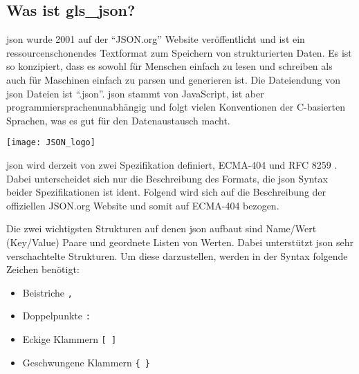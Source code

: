 \subsection{Was ist \gls{gls_json}?}\label{json_kapitel}
\begin{minipage}{0.6\textwidth}
	\acf{json} wurde 2001 auf der \enquote{JSON.org} Website veröffentlicht und ist ein ressourcenschonendes Textformat zum Speichern von strukturierten Daten. Es ist so konzipiert, dass es sowohl für Menschen einfach zu lesen und schreiben als auch für Maschinen einfach zu parsen und generieren ist. Die Dateiendung von \acs{json} Dateien ist \enquote{.json}. \acs{json} stammt von JavaScript, ist aber programmiersprachenunabhängig und folgt vielen Konventionen der C-basierten Sprachen, was es gut für den Datenaustausch macht. \cite[vgl.][]{json_org:o.J., ECMA:2017}
\end{minipage}%
\hfill
\begin{minipage}{0.37\textwidth}
	\centering	
	\texttt{[image: JSON\_logo]}
\end{minipage}
\vspace{1ex}

\acs{json} wird derzeit von zwei Spezifikation definiert, ECMA-404 \cite[vgl.][]{ECMA:2017} und RFC 8259 \cite[vgl.][]{Bray:2017}. Dabei unterscheidet sich nur die Beschreibung des Formats, die \acs{json} Syntax beider Spezifikationen ist ident. Folgend wird sich auf die Beschreibung der offiziellen JSON.org Website \cite[vgl.][]{json_org:o.J.} und somit auf ECMA-404 \cite[vgl.][]{ECMA:2017} bezogen.

Die zwei wichtigsten Strukturen auf denen \acs{json} aufbaut sind Name/Wert (\engl Key/Value) Paare und geordnete Listen von Werten. Dabei unterstützt \acs{json} sehr verschachtelte Strukturen. Um diese darzustellen, werden in der Syntax folgende Zeichen benötigt:
\begin{itemize}
	 \item Beistriche \lstinline|,|
	 \item Doppelpunkte \lstinline|:|
	 \item Eckige Klammern \lstinline|[ ]|
	 \item Geschwungene Klammern \lstinline|{ }|
\end{itemize}


